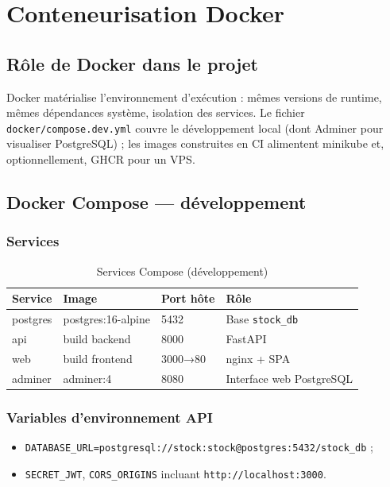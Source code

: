 \chapter{Conteneurisation Docker}
\label{ch:docker}

\section{Rôle de Docker dans le projet}

Docker matérialise l'environnement d'exécution : mêmes versions de runtime, mêmes dépendances système, isolation des services. Le fichier \texttt{docker/compose.dev.yml} couvre le développement local (dont Adminer pour visualiser PostgreSQL) ; les images construites en CI alimentent minikube et, optionnellement, GHCR pour un VPS.

\section{Docker Compose — développement}

\subsection{Services}

\begin{table}[htbp]
  \centering
  \caption{Services Compose (développement)}
  \label{tab:compose-services}
  \begin{tabular}{@{}llll@{}}
    \toprule
    \textbf{Service} & \textbf{Image} & \textbf{Port hôte} & \textbf{Rôle} \\
    \midrule
    postgres & postgres:16-alpine & 5432 & Base \texttt{stock\_db} \\
    api & build backend & 8000 & FastAPI \\
    web & build frontend & 3000→80 & nginx + SPA \\
    adminer & adminer:4 & 8080 & Interface web PostgreSQL \\
    \bottomrule
  \end{tabular}
\end{table}

\subsection{Variables d'environnement API}

\begin{itemize}
  \item \texttt{DATABASE\_URL=postgresql://stock:stock@postgres:5432/stock\_db} ;
  \item \texttt{SECRET\_JWT}, \texttt{CORS\_ORIGINS} incluant \texttt{http://localhost:3000}.
\end{itemize}

